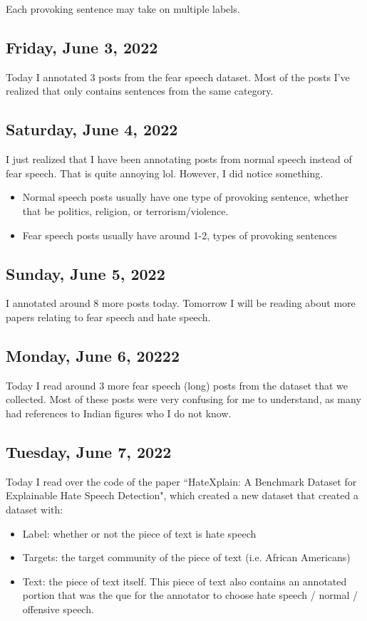 \documentclass[11pt,letterpaper]{article}
\begin{document}
Each provoking sentence may take on multiple labels. 

\subsection{Friday, June 3, 2022}
Today I annotated 3 posts from the fear speech dataset. Most of the posts I've realized that only contains sentences from the same category.

\subsection{Saturday, June 4, 2022}
I just realized that I have been annotating posts from normal speech instead of fear speech. That is quite annoying lol. However, I did notice something.

\begin{itemize}
    \item Normal speech posts usually have one type of provoking sentence, whether that be politics, religion, or terrorism/violence.
    \item Fear speech posts usually have around 1-2, types of provoking sentences
\end{itemize}

\subsection{Sunday, June 5, 2022}
I annotated around 8 more posts today. Tomorrow I will be reading about more papers relating to fear speech and hate speech.

\subsection{Monday, June 6, 20222}
Today I read around 3 more fear speech (long) posts from the dataset that we collected. Most of these posts were very confusing for me to understand, as many had references to Indian figures who I do not know.

\subsection{Tuesday, June  7, 2022}
Today I read over the code of the paper ``HateXplain: A Benchmark Dataset for Explainable Hate Speech Detection", which created a new dataset that created a dataset with:
\begin{itemize}
    \item Label: whether or not the piece of text is hate speech
    \item Targets: the target community of the piece of text (i.e. African Americans)
    \item Text: the piece of text itself. This piece of text also contains an annotated portion that was the que for the annotator to choose hate speech / normal / offensive speech.
\end{itemize}
\end{document}
